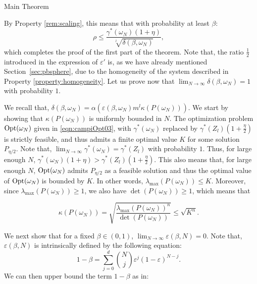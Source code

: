 \begin{subsection}{Main Theorem}
\begin{pf}
By Property \ref{rem:scaling}, this means that with probability at least $\beta$:
$$\rho \leq \frac{\gamma^{*}(\omega_N) (1 + \eta)}{\sqrt[l]{\delta(\beta, \omega_N)}},$$
which completes the proof of the first part of the theorem. Note that, the ratio $\frac{1}{2}$ introduced in the expression of $\varepsilon'$ is, as we have already mentioned Section~\ref{sec:pbsphere}, due to the homogeneity of the system described in Property \ref{property:homogeneity}.
%
%
Let us prove now that $\lim_{N \to \infty} \delta(\beta, \omega_N) = 1$ with probability $1$.

We recall that, $\delta(\beta, \omega_N) = \alpha \left( \varepsilon(\beta, \omega_N) m^l \kappa(P(\omega_N)) \right)$. We start by showing that $\kappa \left( P(\omega_N) \right)$  is uniformly bounded in $N$. The optimization problem $\text{Opt}(\omega_N)$ given in \eqref{eqn:campiOpt03}, with $\gamma^{*}(\omega_N)$ replaced by $\gamma^{*}(Z_l)(1+\frac{\eta}{2})$ is strictly feasible, and thus admits a finite optimal value $K$ for some solution $P_{\eta/2}$. Note that, $\lim_{N \to \infty} \gamma^{*}(\omega_N)= \gamma^{*}(Z_l)$ with probability $1$. Thus, for large enough $N$, \mbox{$\gamma^{*}(\omega_N)(1+\eta) > \gamma^{*}(Z_l)(1+\frac{\eta}{2})$.} This also means that, for large enough $N$, $\text{Opt}(\omega_N)$ admits $P_{\eta/2}$ as a feasible solution and thus the optimal value of $\text{Opt}(\omega_N)$ is bounded by $K.$ In other words, \mbox{$\lambda_{\max}(P({\omega_N})) \leq K$.} Moreover, since  
$\lambda_{\max}(P(\omega_N))\geq 1$, we also have \mbox{$\det(P(\omega_N)) \geq 1$,} which means that

\begin{equation}\label{kappa}
\kappa \left( P(\omega_N) \right) = \sqrt{\frac{\lambda_{\max}(P(\omega_N))^n}{\det(P(\omega_N))}} \leq \sqrt{K^n}.
\end{equation}

We next show that for a fixed $\beta \in (0,1)$, $\lim_{N \to \infty} \varepsilon(\beta, N) = 0$. Note that, $\varepsilon(\beta, N)$ is intrinsically defined by the following equation:
$$1-\beta = \sum_{j=0}^d {{N}\choose{j}} \varepsilon^j (1-\varepsilon)^{N-j}.$$
We can then upper bound the term $1-\beta$ as in:


\end{pf}
\end{subsection}
